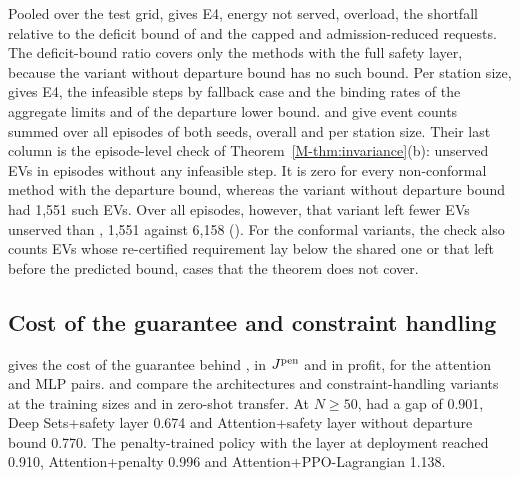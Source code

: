 Pooled over the test grid,  gives E4, energy not served, overload, the shortfall relative to the deficit bound of  and the capped and admission-reduced requests.
The deficit-bound ratio covers only the methods with the full safety layer, because the variant without departure bound has no such bound.
Per station size,  gives E4, the infeasible steps by fallback case and the binding rates of the aggregate limits and of the departure lower bound.
 and  give event counts summed over all episodes of both seeds, overall and per station size.
Their last column is the episode-level check of Theorem~\ref{M-thm:invariance}(b): unserved EVs in episodes without any infeasible step.
It is zero for every non-conformal method with the departure bound, whereas the variant without departure bound had 1,551 such EVs.
Over all episodes, however, that variant left fewer EVs unserved than \method{}, 1,551 against 6,158 ().
For the conformal variants, the check also counts EVs whose re-certified requirement lay below the shared one or that left before the predicted bound, cases that the theorem does not cover.


\subsection{Cost of the guarantee and constraint handling}\label{app:res-ablation}

 gives the cost of the guarantee behind , in $J^{\mathrm{pen}}$ and in profit, for the attention and MLP pairs.
 and  compare the architectures and constraint-handling variants at the training sizes and in zero-shot transfer.
At $N\ge50$, \method{} had a gap of 0.901, Deep Sets+safety layer 0.674 and Attention+safety layer without departure bound 0.770.
The penalty-trained policy with the layer at deployment reached 0.910, Attention+penalty 0.996 and Attention+PPO-Lagrangian 1.138.


